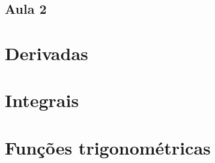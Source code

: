 \documentclass[12pt, a4paper]{article}
\begin{document}
			\subsection{Aula 2}
				
			
			
			
			
			
		
		\appendix
		\section{Derivadas}
			
		\section{Integrais}
			
		\section{Funções trigonométricas}
			
				
		
				
\end{document}
